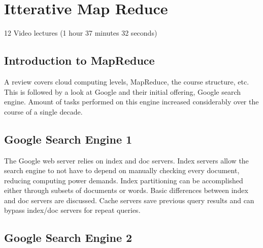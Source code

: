 \chapter{Itterative Map Reduce}
\label{sec:icloud-iterative-mapreduce}

\FILENAME

12 Video lectures (1 hour 37 minutes 32 seconds)

\section{Introduction to MapReduce}

A review covers cloud computing levels, MapReduce, the course structure,
etc. This is followed by a look at Google and their initial offering,
Google search engine. Amount of tasks performed on this engine increased
considerably over the course of a single decade.



\section{Google Search Engine 1}

The Google web server relies on index and doc servers. Index servers
allow the search engine to not have to depend on manually checking every
document, reducing computing power demands. Index partitioning can be
accomplished either through subsets of documents or words. Basic
differences between index and doc servers are discussed. Cache servers
save previous query results and can bypass index/doc servers for repeat
queries.




\section{Google Search Engine 2}

